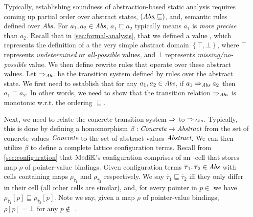 Typically, establishing soundness of abstraction-based static analysis
requires coming up partial order over abstract states,
$\left(\textit{Abs}, \sqsubseteq\right)$, and, semantic rules defined over $\textit{Abs}$.
For $a_1, a_2 \in \textit{Abs}$, $a_1 \sqsubseteq a_2$ typically means $a_1$ is
\emph{more precise} than $a_2$. Recall that in \autoref{sec:formal-analysis},
that we defined a value , which represents the definition of a
the very simple abstract
domain $\left\{\top,\bot\right\}$, where $\top$ represents
\emph{undetermined} or \emph{all-possible} values, and $\bot$ represents
\emph{missing/no-possible} value. We then define rewrite rules
that operate over these abstract values. Let $\Rightarrow_{\textit{Abs}}$ be the transition
system defined by rules over the abstract state. We first need to
establish that for any $a_1, a_2 \in \textit{Abs}$, if $a_1 \Rightarrow_{\textit{Abs}} a_2$ then $a_1
\sqsubseteq a_2$. In other words, we need to show that the transition relation
$\Rightarrow_{\textit{Abs}}$ is monotonic w.r.t. the ordering $\sqsubseteq$.

Next, we need to relate the concrete transition system $\Rightarrow$ to $\Rightarrow_{\textit{Abs}}$.
Typically, this is done by defining a homomorphism $\beta: \textit{Concrete} \to \textit{Abstract}$
from the set of concrete values $\textit{Concrete}$ to the set of abstract values
$\textit{Abstract}$. We can then utilize $\beta$ to define a complete lattice
configuration terms. Recall from \autoref{sec:configuration} that
$\text{Medi}\mathbb{K}{}{}$'s configuration comprises of an -cell that
stores map $\rho$ of pointer-value bindings.
Given configuration terms $\overline{\tau}_1, \overline{\tau}_2 \in
\textit{Abs}$ with  cells containing maps $\rho_{\overline{\tau}_1}$ and
$\rho_{\overline{\tau}_2}$ respectively.
We say $\overline{\tau}_1 \sqsubseteq \overline{\tau}_2$ iff
they only differ in their
 cell (all other cells are similar), and, for every
pointer in $p \in$ 
we have $\rho_{\overline{\tau}_1}[p] \sqsubseteq \rho_{\overline{\tau}_2}[p]$. Note we
say, given a map $\rho$ of pointer-value bindings,
$\rho[p] = \bot$ for any $p \not\in$ .

